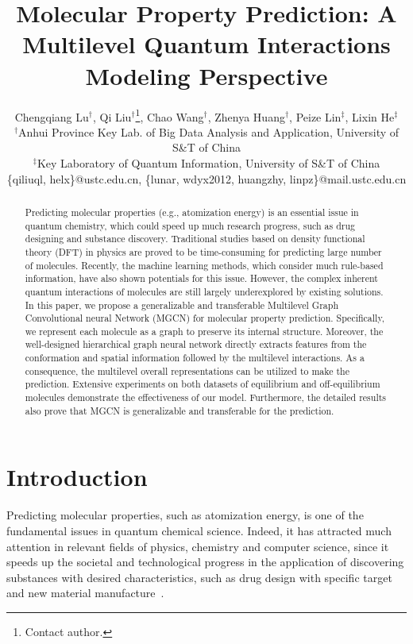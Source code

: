 \documentclass[letterpaper]{article} \usepackage{bm}
\begin{document}
\author{
Chengqiang Lu$^\dag${\normalfont,\;}
Qi Liu$^\dag$\thanks{Contact author.}{\normalfont,\;}
Chao Wang$^\dag${\normalfont,\;}
Zhenya Huang$^\dag${\normalfont,\;}
Peize Lin$^\ddag${\normalfont,\;}
Lixin He$^\ddag$ \\
	$^\dag$Anhui Province Key Lab. of Big Data Analysis and Application, University of S\&T of China\\$^\ddag$Key Laboratory of Quantum Information, University of S\&T of China
	\\ \{qiliuql, helx\}@ustc.edu.cn, \{lunar, wdyx2012, huangzhy, linpz\}@mail.ustc.edu.cn}
	


\title{Molecular Property Prediction: A Multilevel Quantum Interactions\\ Modeling Perspective}
\maketitle

\begin{abstract}
Predicting molecular properties (e.g., atomization energy) is an essential issue in quantum chemistry, which could speed up much research progress, such as drug designing and substance discovery. Traditional studies based on density functional theory (DFT) in physics are proved to be time-consuming for predicting large number of molecules. Recently, the machine learning methods, which consider much rule-based information, have also shown potentials for this issue. However, the complex inherent quantum interactions of molecules are still largely underexplored by existing solutions. In this paper, we propose a generalizable and transferable Multilevel Graph Convolutional neural Network (MGCN) for molecular property prediction. Specifically, we represent each molecule as a graph to preserve its internal structure. Moreover, the well-designed hierarchical graph neural network directly extracts features from the conformation and spatial information followed by the multilevel interactions. As a consequence, the multilevel overall representations can be utilized to make the prediction. Extensive experiments on both datasets of equilibrium and off-equilibrium molecules demonstrate the effectiveness of our model. Furthermore, the detailed results also prove that MGCN is generalizable and transferable for the prediction.
\end{abstract}


\section{Introduction}
Predicting molecular properties, such as atomization energy, is one of the fundamental issues in quantum chemical science.
Indeed, it has attracted much attention in relevant fields of physics, chemistry and computer science, since it speeds up the societal and technological progress in the application of discovering substances with desired characteristics, such as drug design with specific target and new material manufacture~\cite{becke2007quantum,oglic2017active}.
\end{document}
